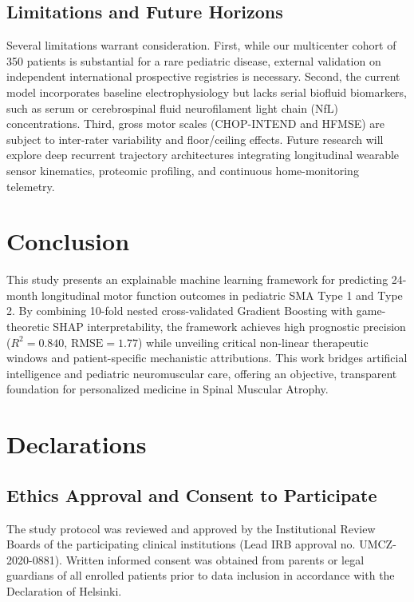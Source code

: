 \documentclass[journal]{IEEEtran}
\begin{document}
\subsection{Limitations and Future Horizons}
Several limitations warrant consideration. First, while our multicenter cohort of 350 patients is substantial for a rare pediatric disease, external validation on independent international prospective registries is necessary. Second, the current model incorporates baseline electrophysiology but lacks serial biofluid biomarkers, such as serum or cerebrospinal fluid neurofilament light chain (NfL) concentrations. Third, gross motor scales (CHOP-INTEND and HFMSE) are subject to inter-rater variability and floor/ceiling effects. Future research will explore deep recurrent trajectory architectures integrating longitudinal wearable sensor kinematics, proteomic profiling, and continuous home-monitoring telemetry.

\section{Conclusion}
This study presents an explainable machine learning framework for predicting 24-month longitudinal motor function outcomes in pediatric SMA Type 1 and Type 2. By combining 10-fold nested cross-validated Gradient Boosting with game-theoretic SHAP interpretability, the framework achieves high prognostic precision ($R^2 = 0.840$, $\text{RMSE} = 1.77$) while unveiling critical non-linear therapeutic windows and patient-specific mechanistic attributions. This work bridges artificial intelligence and pediatric neuromuscular care, offering an objective, transparent foundation for personalized medicine in Spinal Muscular Atrophy.

\section*{Declarations}

\subsection*{Ethics Approval and Consent to Participate}
The study protocol was reviewed and approved by the Institutional Review Boards of the participating clinical institutions (Lead IRB approval no. UMCZ-2020-0881). Written informed consent was obtained from parents or legal guardians of all enrolled patients prior to data inclusion in accordance with the Declaration of Helsinki.
\end{document}
